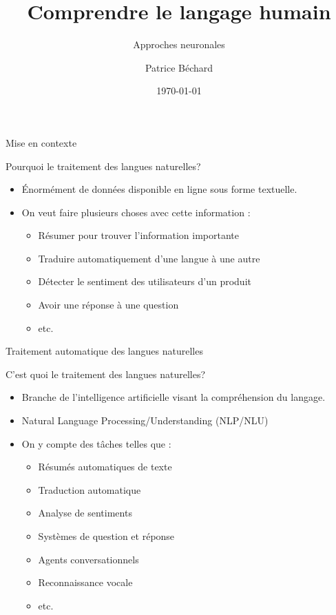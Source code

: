 \documentclass[french]{beamer}
\author{Patrice Béchard}
\institute[MILA]{\small{MILA}}
\title{Comprendre le langage humain}
\subtitle{Approches neuronales}
\date{\today}
\begin{document}
\begin{frame}[plain, t]
  \titlepage
\end{frame}


\begin{frame}{Mise en contexte}

\centering
{\LARGE Pourquoi le traitement des langues naturelles?}
\vspace{.5cm}

\raggedright
\begin{itemize}
	\item Énormément de données disponible en ligne sous forme textuelle.
	\vspace{.5cm}
	\item On veut faire plusieurs choses avec cette information :
	\begin{itemize}
		\item Résumer pour trouver l'information importante
		\item Traduire automatiquement d'une langue à une autre
		\item Détecter le sentiment des utilisateurs d'un produit
		\item Avoir une réponse à une question
		\item etc.
	\end{itemize}
\end{itemize}
\end{frame}


\begin{frame}{Traitement automatique des langues naturelles}

\centering
{\LARGE C'est quoi le traitement des langues naturelles?}
\vspace{.5cm}

\raggedright
\begin{itemize}
	\item Branche de l'intelligence artificielle visant la compréhension du langage.
	\item Natural Language Processing/Understanding (NLP/NLU)
	\item On y compte des tâches telles que :
	\begin{itemize}
		\item Résumés automatiques de texte
		\item Traduction automatique
		\item Analyse de sentiments
		\item Systèmes de question et réponse
		\item Agents conversationnels
		\item Reconnaissance vocale
		\item etc.
	\end{itemize}
\end{itemize}
\end{frame}
\end{document}
